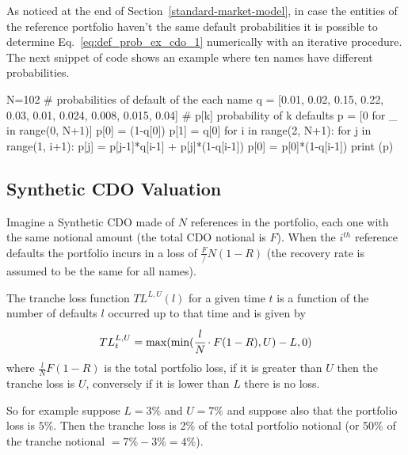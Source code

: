 \begin{attention}
As noticed at the end of Section~\ref{standard-market-model}, in case the entities of the reference portfolio haven't the same default probabilities it is possible to determine Eq.~\ref{eq:def_prob_ex_cdo_1} numerically with an iterative procedure. The next snippet of code shows an example where ten names have different probabilities.

\begin{attpython}
N=102
# probabilities of default of the each name
q = [0.01, 0.02, 0.15, 0.22, 0.03, 0.01, 0.024, 0.008, 0.015, 0.04]
# p[k] probability of k defaults
p = [0 for _ in range(0, N+1)]
p[0] = (1-q[0])
p[1] = q[0]
for i in range(2, N+1):
    for j in range(1, i+1):
        p[j] = p[j-1]*q[i-1] + p[j]*(1-q[i-1])
    p[0] = p[0]*(1-q[i-1])
print (p)
\end{attpython}
\begin{ioutput}
[0.5655235318063276, 0.350403844356834, 0.11955743831716371,
 0.03306691281696737, 0.007898676408014359, 0.0008119173181899153,
 5.3505698491409986e-05, 2.8142380742779974e-06, 1.2554827537575903e-07,
 5.2166123010999485e-09, 2.0866449204399796e-10]
\end{ioutput}
\end{attention}

\subsection{Synthetic CDO Valuation}
Imagine a Synthetic CDO made of $N$ references in the portfolio, each one with the same notional amount (the total CDO notional is $F$).
When the $i^{th}$ reference defaults the portfolio incurs in a loss of $\frac{F}/{N}(1-R)$ (the recovery rate is assumed to be the same for all names).

The tranche loss function $TL^{L,U}(l)$ for a given time $t$ is a function of the number of defaults $l$ occurred up to that time and is given by
\begin{equation}
TL_{t}^{L,U}=\mathrm{max}(\mathrm{min}(\cfrac{l}{N}\cdot F(1-R), U)-L, 0)
\end{equation}
where $\frac{l}{N}F(1-R)$ is the total portfolio loss, if it is greater than $U$ then the tranche loss is $U$, conversely if it is lower than $L$ there is no loss.

So for example suppose $L=3\%$ and $U=7\%$ and suppose also that the portfolio loss is $5\%$. Then the tranche loss is 2\% of the total portfolio notional (or 50\% of the tranche notional $=7\%-3\%=4\%$).

